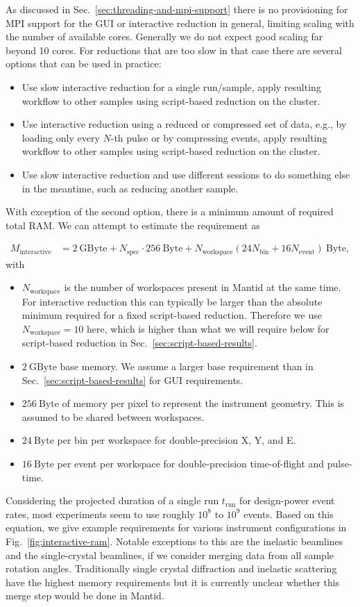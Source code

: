 \documentclass[a4paper,english,numbers=noenddot,bibliography=totoc,chapterprefix=on,DIV=12]{scrartcl}
\newcommand{\Trun}{t_{\text{run}}}
\newcommand{\Nbin}{N_{\text{bin}}}
\newcommand{\Nevent}{N_{\text{event}}}
\newcommand{\Nworkspace}{N_{\text{workspace}}}
\newcommand{\Nspec}{N_{\text{spec}}}
\newcommand{\mantid}{Mantid\xspace}
\begin{document}
As discussed in Sec.~\ref{sec:threading-and-mpi-support} there is no provisioning for MPI support for the GUI or interactive reduction in general, limiting scaling with the number of available cores.
Generally we do not expect good scaling far beyond 10 cores.
For reductions that are too slow in that case there are several options that can be used in practice:
\begin{itemize}
  \item Use slow interactive reduction for a single run/sample, apply resulting workflow to other samples using script-based reduction on the cluster.
  \item Use interactive reduction using a reduced or compressed set of data, e.g., by loading only every $N$-th pulse or by compressing events, apply resulting workflow to other samples using script-based reduction on the cluster.
  \item Use slow interactive reduction and use different sessions to do something else in the meantime, such as reducing another sample.
\end{itemize}
With exception of the second option, there is a minimum amount of required total RAM.
We can attempt to estimate the requirement as

\begin{align}
  \label{eq:ram-interactive}
  M_{\text{interactive}} &= 2~\mathrm{GByte} + \Nspec \cdot 256~\mathrm{Byte} + N_{\text{workspace}}(24\Nbin + 16\Nevent)~\mathrm{Byte},
\end{align}
with
\begin{itemize}
  \item $\Nworkspace$ is the number of workspaces present in \mantid at the same time.
    For interactive reduction this can typically be larger than the absolute minimum required for a fixed script-based reduction.
    Therefore we use $\Nworkspace = 10$ here, which is higher than what we will require below for script-based reduction in Sec.~\ref{sec:script-based-results}.
  \item $2~\mathrm{GByte}$ base memory.
    We assume a larger base requirement than in Sec.~\ref{sec:script-based-results} for GUI requirements.
  \item $256~\mathrm{Byte}$ of memory per pixel to represent the instrument geometry.
    This is assumed to be shared between workspaces.
  \item $24~\mathrm{Byte}$ per bin per workspace for double-precision X, Y, and E.
  \item $16~\mathrm{Byte}$ per event per workspace for double-precision time-of-flight and pulse-time.
\end{itemize}
Considering the projected duration of a single run $\Trun$ for design-power event rates, most experiments seem to use roughly $10^8$ to $10^9$ events.
Based on this equation, we give example requirements for various instrument configurations in Fig.~\ref{fig:interactive-ram}.
Notable exceptions to this are the inelastic beamlines and the single-crystal beamlines, if we consider merging data from all sample rotation angles.
Traditionally single crystal diffraction and inelastic scattering have the highest memory requirements but it is currently unclear whether this merge step would be done in \mantid.
\end{document}

